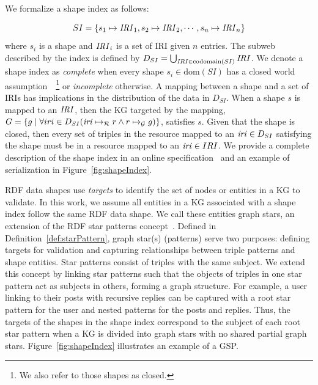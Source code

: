 We formalize a shape index as follows:

\begin{equation}\label{eq:shapeIndex}
	SI = \left\{ s_1 \mapsto \mathit{IRI}_1, s_2 \mapsto \mathit{IRI}_2, \cdots, s_n \mapsto \mathit{IRI}_n \right\}
\end{equation}
where $s_i$ is a shape and $\mathit{IRI}_i$ is a set of \ac{IRI} given $n$ entries.
The subweb described by the index is defined by $D_{SI} = \bigcup_{\mathit{IRI} \in \text{codomain}(SI)} \mathit{IRI}$.
We denote a shape index as \emph{complete} when every shape $s_i \in \text{dom}(SI)$ has a closed world assumption~\cite{Gayo2018b, Gayo2018}~\footnote{We also refer to those shapes as closed.} or \emph{incomplete} otherwise.
A mapping between a shape and a set of \acp{IRI} has implications in the distribution of the data in $D_{SI}$.
When a shape $s$ is mapped to an $\mathit{IRI}$, then the \ac{KG} targeted by the mapping, $G = \left\{ g \mid \forall iri \in D_{SI} (\mathit{iri} \mapsto_{\mathcal{R}} r \land r \mapsto_{\mathcal{G}} g) \right\}$, satisfies $s$.
Given that the shape is closed, then every set of triples in the resource mapped to an $\mathit{iri} \in D_{SI}$ satisfying the shape must be in a resource mapped to an $\mathit{iri} \in IRI$.
We provide a complete description of the shape index in an online specification~ and an example of serialization in Figure~\ref{fig:shapeIndex}.

\ac{RDF} data shapes use \emph{targets} to identify the set of nodes or entities in a \ac{KG} to validate.
In this work, we assume all entities in a \ac{KG} associated with a shape index follow the same \ac{RDF} data shape.
We call these entities graph stars, an extension of the \ac{RDF} star patterns concept~\cite{Karim2020}.
Defined in Definition~\ref{def:starPattern}, graph star(s) (patterns)  serve two purposes:
defining targets for validation and capturing relationships between triple patterns and shape entities.
Star patterns consist of triples with the same subject.
We extend this concept by linking star patterns such that the objects of triples in one star pattern act as subjects in others, forming a graph structure.
For example, a user linking to their posts with recursive replies can be captured with a root star pattern for the user and nested patterns for the posts and replies.
Thus, the targets of the shapes in the shape index correspond to the subject of each root star pattern when a \ac{KG} is divided into graph stars with no shared partial graph stars.
Figure~\ref{fig:shapeIndex} illustrates an example of a \ac{GSP}.

